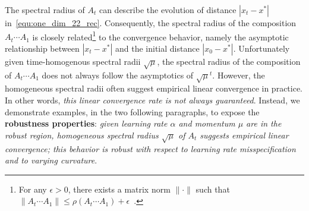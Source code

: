 \documentclass{article} %
\newcommand{\mat}[1]{\bm{\mathit{#1}}}
\begin{document}
The spectral radius of $\mat{A}_t$ can describe the evolution of distance $|x_t -x^*|$ in~\eqref{equ:one_dim_22_rec}. Consequently, the spectral radius of the composition $\mat{A}_t\cdots\mat{A}_1$ is closely related\footnote{For any $\epsilon > 0$, there exists a matrix norm $\|\cdot\|$ such that $\|\mat{A}_t\cdots\mat{A}_1\| \leq \rho(\mat{A}_t\cdots\mat{A}_1) + \epsilon$~\citep{simon2012spectralradius}.} to the convergence behavior, namely the asymptotic relationship between $|x_t -x^*|$ and the initial distance $|x_0 - x^*|$. 
Unfortunately given time-homogenous spectral radii $\sqrt{\mu}$, the spectral radius of the composition of $\mat{A}_t\cdots\mat{A}_1$ does not always follow the asymptotics of $\sqrt{\mu}^t$. However, the homogeneous spectral radii often suggest empirical linear convergence in practice.
In other words, {\em this linear convergence rate is not always guaranteed}. Instead, we demonstrate examples, in the two following paragraphs, to expose the {\bf robustness properties}: \emph{given learning rate $\alpha$ and momentum $\mu$ are in the robust region, 
homogeneous spectral radius $\sqrt{\mu}$ of $\mat{A}_t$ suggests empirical linear convergence; this behavior is robust with respect to learning rate misspecification and to varying curvature}.
\end{document}
